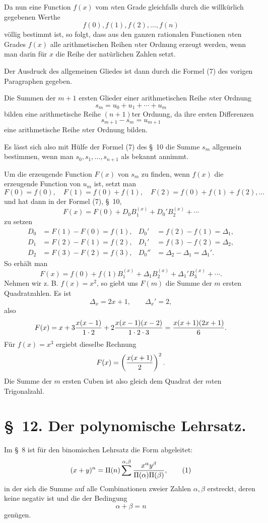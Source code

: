 \documentclass[11pt]{article}
\begin{document}
Da nun eine Function $f(x)$ vom $n$ten Grade gleichfalls durch die willkürlich gegebenen Werthe
\[
 f(0),f(1),f(2),\ldots,f(n)
\]
völlig bestimmt ist, so folgt, dass aus den ganzen rationalen Functionen $n$ten Grades $f(x)$ alle arithmetischen Reihen $n$ter Ordnung erzeugt werden, wenn man darin für $x$ die Reihe der natürlichen Zahlen setzt.

Der Ausdruck des allgemeinen Gliedes ist dann durch die Formel (7) des vorigen Paragraphen gegeben.

Die Summen der $m+1$ ersten Glieder einer arithmetischen Reihe $n$ter Ordnung
\[
 s_m=u_0+u_1+\cdots+u_m
\]
bilden eine arithmetische Reihe $(n+1)$ter Ordnung, da ihre ersten Differenzen
\[
 s_{m+1}-s_m=u_{m+1}
\]
eine arithmetische Reihe $n$ter Ordnung bilden.

Es lässt sich also mit Hülfe der Formel (7) des \S~10 die Summe $s_m$ allgemein bestimmen, wenn man $s_0,s_1,\ldots,s_{n+1}$ als bekannt annimmt.

Um die erzeugende Function $F(x)$ von $s_m$ zu finden, wenn $f(x)$ die erzeugende Function von $u_m$ ist, setzt man
\[
 F(0)=f(0),\quad F(1)=f(0)+f(1),\quad F(2)=f(0)+f(1)+f(2),\ldots
\]
und hat dann in der Formel (7), \S~10,
\[
 F(x)=F(0)+D_0B_1^{(x)}+D_0'B_2^{(x)}+\cdots
\]
zu setzen
\[
\begin{aligned}
D_0&=F(1)-F(0)=f(1),& D_0'&=f(2)-f(1)=\Delta_1,\\
D_1&=F(2)-F(1)=f(2),& D_1'&=f(3)-f(2)=\Delta_2,\\
D_2&=F(3)-F(2)=f(3),& D_0''&=\Delta_2-\Delta_1=\Delta_1'.
\end{aligned}
\]
So erhält man
\begin{equation}
 F(x)=f(0)+f(1)B_1^{(x)}+\Delta_1B_2^{(x)}+\Delta_1'B_3^{(x)}+\cdots.
\tag{4}
\end{equation}
Nehmen wir z. B. $f(x)=x^2$, so giebt uns $F(m)$ die Summe der $m$ ersten Quadratzahlen. Es ist
\[
 \Delta_x=2x+1,
 \qquad \Delta_x'=2,
\]
also
\[
 F(x)=x+3{x(x-1)\over 1\cdot2}+2{x(x-1)(x-2)\over 1\cdot2\cdot3}
 ={x(x+1)(2x+1)\over6}.
\]
Für $f(x)=x^3$ ergiebt dieselbe Rechnung
\[
 F(x)=\left({x(x+1)\over2}\right)^2.
\]
Die Summe der $m$ ersten Cuben ist also gleich dem Quadrat der $m$ten Trigonalzahl.

\section*{\S~12. Der polynomische Lehrsatz.}

Im \S~8 ist für den binomischen Lehrsatz die Form abgeleitet:
\begin{equation}
 (x+y)^n=\Pi(n)\sum^{\alpha,\beta}{x^\alpha y^\beta\over \Pi(\alpha)\Pi(\beta)},
\tag{1}
\end{equation}
in der sich die Summe auf alle Combinationen zweier Zahlen $\alpha,\beta$ erstreckt, deren keine negativ ist und die der Bedingung
\begin{equation}
 \alpha+\beta=n
\tag{2}
\end{equation}
genügen.
\end{document}
